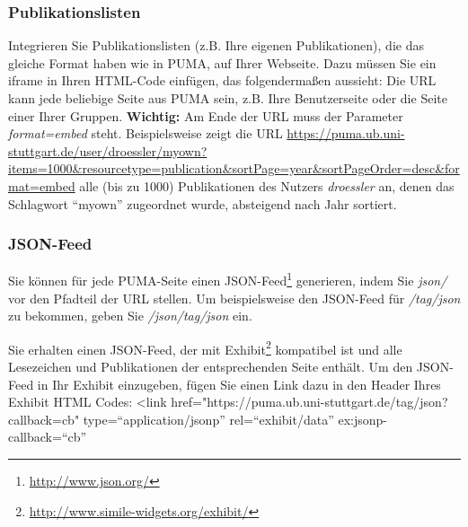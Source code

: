 \subsubsection{Publikationslisten}
Integrieren Sie Publikationslisten (z.B. Ihre eigenen Publikationen), die das gleiche Format haben wie in PUMA, auf Ihrer Webseite. Dazu müssen Sie ein iframe in Ihren HTML-Code einfügen, das folgendermaßen aussieht: %
\newline Die URL kann jede beliebige Seite aus PUMA sein, z.B. Ihre Benutzerseite oder die Seite einer Ihrer Gruppen. \textbf{Wichtig:} Am Ende der URL muss der Parameter \textit{format=embed} steht. Beispielsweise zeigt die URL \url{https://puma.ub.uni-stuttgart.de/user/droessler/myown?items=1000&resourcetype=publication&sortPage=year&sortPageOrder=desc&format=embed}
alle (bis zu 1000) Publikationen des Nutzers \textit{droessler} an, denen das Schlagwort \enquote{myown} zugeordnet wurde, absteigend nach Jahr sortiert.

\subsubsection{JSON-Feed}
Sie können für jede PUMA-Seite einen JSON-Feed\footnote{\url{http://www.json.org/}} generieren, indem Sie \textit{json/} vor den Pfadteil der URL stellen. Um beispielsweise den JSON-Feed für \textit{/tag/json} zu bekommen, geben Sie \textit{/json/tag/json} ein.

Sie erhalten einen JSON-Feed, der mit Exhibit\footnote{\url{http://www.simile-widgets.org/exhibit/}} kompatibel ist und alle Lesezeichen und Publikationen der entsprechenden Seite enthält. Um den JSON-Feed in Ihr Exhibit einzugeben, fügen Sie einen Link dazu in den Header Ihres Exhibit HTML Codes:\newline
\newline
<link href="https://puma.ub.uni-stuttgart.de/tag/json?callback=cb" type=\enquote{application/jsonp} rel=\enquote{exhibit/data} ex:jsonp-callback=\enquote{cb}%
\newline

